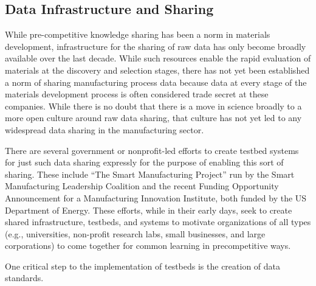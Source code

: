 

\subsection{Data Infrastructure and Sharing}
While pre-competitive knowledge sharing has been a norm in materials development, infrastructure for the sharing of raw data has only become broadly available over the last decade\cite{CitrineInformatics,MP}. While such resources enable the rapid evaluation of materials at the discovery and selection stages, there has not yet been established a norm of sharing manufacturing process data because data at every stage of the materials development process is often considered trade secret at these companies\cite{TheMinerals2013}. While there is no doubt that there is a move in science broadly to a more open culture around raw data sharing, that culture has not yet led to any widespread data sharing in the manufacturing sector.

There are several government or nonprofit-led efforts to create testbed systems for just such data sharing expressly for the purpose of enabling this sort of sharing. These include ``The Smart Manufacturing Project'' run by the Smart Manufacturing Leadership Coalition and the recent Funding Opportunity Announcement for a Manufacturing Innovation Institute, both funded by the US Department of Energy\cite{SmartManufacturingLeadershipCoalition2013,EERE-MII}. These efforts, while in their early days, seek to create shared infrastructure, testbeds, and systems to motivate organizations of all types (e.g., universities, non-profit research labs, small businesses, and large corporations) to come together for common learning in precompetitive ways. 

One critical step to the implementation of testbeds is the creation of data standards. 


